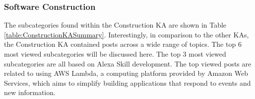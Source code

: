 \documentclass{sigchi}
\begin{document}
\subsubsection{Software Construction}
The subcategories found within the Construction KA are shown in Table \ref{table:ConstructionKASummary}. Interestingly, in comparison to the other KAs, the Construction KA contained posts across a wide range of topics. The top 6 most viewed subcategories will be discussed here. The top 3 most viewed subcategories are all based on Alexa Skill development. The top viewed posts are related to using AWS Lambda, a computing platform provided by Amazon Web Services, which aims to simplify building applications that respond to events and new information. 
\end{document}
